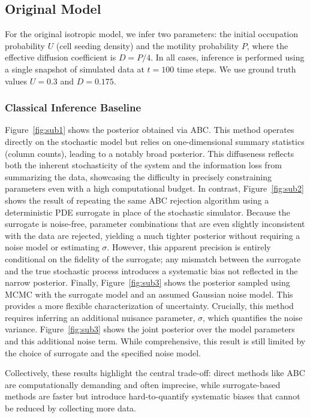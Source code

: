 \documentclass{article}
\begin{document}
\subsection{Original Model}\label{sec:original_model}

For the original isotropic model, we infer two parameters: the initial occupation probability $U$ (cell seeding density) and the motility probability $P$, where the effective diffusion coefficient is $D = P/4$. In all cases, inference is performed using a single snapshot of simulated data at $t=100$ time steps. We use ground truth values $U=0.3$ and $D=0.175$.

\subsubsection{Classical Inference Baseline}\label{sec:results_classical}

Figure~\ref{fig:sub1} shows the posterior obtained via ABC. This method operates directly on the stochastic model but relies on one-dimensional summary statistics (column counts), leading to a notably broad posterior. This diffuseness reflects both the inherent stochasticity of the system and the information loss from summarizing the data, showcasing the difficulty in precisely constraining parameters even with a high computational budget. In contrast, Figure~\ref{fig:sub2} shows the result of repeating the same ABC rejection algorithm using a deterministic PDE surrogate in place of the stochastic simulator. Because the surrogate is noise-free, parameter combinations that are even slightly inconsistent with the data are rejected, yielding a much tighter posterior without requiring a noise model or estimating $\sigma$. However, this apparent precision is entirely conditional on the fidelity of the surrogate; any mismatch between the surrogate and the true stochastic process introduces a systematic bias not reflected in the narrow posterior. Finally, Figure~\ref{fig:sub3} shows the posterior sampled using MCMC with the surrogate model and an assumed Gaussian noise model. This provides a more flexible characterization of uncertainty. Crucially, this method requires inferring an additional nuisance parameter, $\sigma$, which quantifies the noise variance. Figure~\ref{fig:sub3} shows the joint posterior over the model parameters and this additional noise term. While comprehensive, this result is still limited by the choice of surrogate and the specified noise model.

Collectively, these results highlight the central trade-off: direct methods like ABC are computationally demanding and often imprecise, while surrogate-based methods are faster but introduce hard-to-quantify systematic biases that cannot be reduced by collecting more data.
\end{document}
